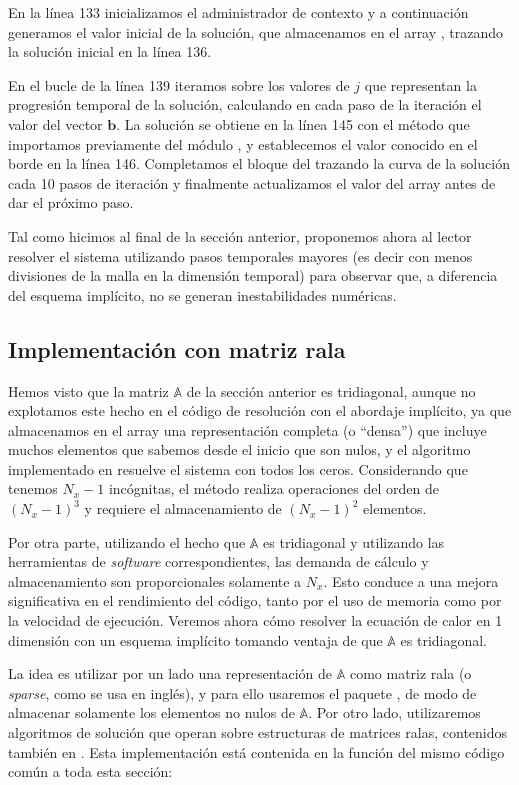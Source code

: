 En la línea 133 inicializamos el administrador de contexto y a continuación generamos el valor inicial de la solución, que almacenamos en el array , trazando la solución inicial en la línea 136.

En el bucle  de la línea 139 iteramos sobre los valores de $j$ que representan la progresión temporal de la solución, calculando en cada paso de la iteración el valor del vector $\bm{b}$. La solución se obtiene en la línea 145 con el método  que importamos previamente del módulo , y establecemos el valor conocido en el borde en la línea 146. Completamos el bloque del  trazando la curva de la solución cada 10 pasos de iteración y finalmente actualizamos el valor del array  antes de dar el próximo paso. 

Tal como hicimos al final de la sección anterior, proponemos ahora al lector resolver el sistema utilizando pasos temporales mayores (es decir con menos divisiones de la malla en la dimensión temporal) para observar que, a diferencia del esquema implícito, no se generan inestabilidades numéricas.

\subsection{Implementación con matriz rala}
Hemos visto que la matriz $\mathbb{A}$ de la sección anterior es tridiagonal, aunque no explotamos este hecho en el código de resolución con el abordaje implícito, ya que almacenamos en el array  una representación completa (o ``densa'') que incluye muchos elementos que sabemos desde el inicio que son nulos, y el algoritmo implementado en  resuelve el sistema con todos los ceros. Considerando que tenemos $N_x-1$ incógnitas, el método  realiza operaciones del orden de $(N_x -1)^3$ y requiere el almacenamiento de $(N_x - 1)^2$ elementos.

Por otra parte, utilizando el hecho que $\mathbb{A}$ es tridiagonal y utilizando las herramientas de \textit{software} correspondientes, las demanda de cálculo y almacenamiento son proporcionales solamente a $N_x$. Esto conduce a una mejora significativa en el rendimiento del código, tanto por el uso de memoria como por la velocidad de ejecución. Veremos ahora cómo resolver la ecuación de calor en 1 dimensión con un esquema implícito tomando ventaja de que $\mathbb{A}$ es tridiagonal.

La idea es utilizar por un lado una representación de $\mathbb{A}$ como matriz rala (o \textit{sparse}, como se usa en inglés), y para ello usaremos el paquete , de modo de almacenar solamente los elementos no nulos de $\mathbb{A}$. Por otro lado, utilizaremos algoritmos de solución que operan sobre estructuras de matrices ralas, contenidos también en . Esta implementación está contenida en la función  del mismo código común a toda esta sección:

